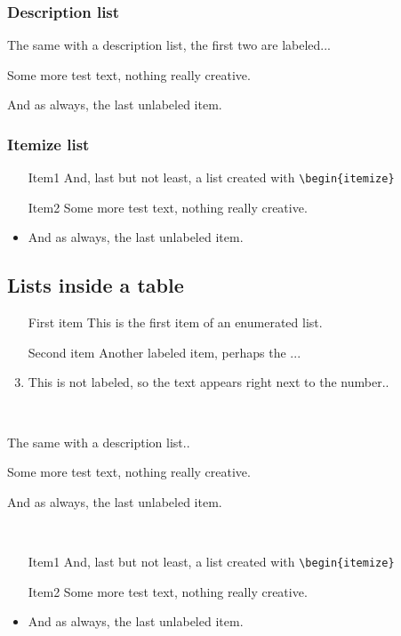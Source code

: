 \documentclass{generic}
\begin{document}
\subsubsection{Description list}
\begin{description}
\item[Item1]
  The same with a description list, 
  the first two are labeled...
\item[Item2]
  Some more test text, nothing really creative.
\item
  And as always, the last unlabeled item.
\end{description}

\subsubsection{Itemize list}
\begin{itemize}
\item[Item1]
  And, last but not least, a list created with \verb/\begin{itemize}/
\item[Item2]
  Some more test text, nothing really creative.
\item
  And as always, the last unlabeled item.
\end{itemize}
\endverbatim

\subsection{Lists inside a table}

\verbatim

\begin{table}
\begin{enumerate}
\item[First item]
  This is the first item of an enumerated list. 
\item[Second item]
  Another labeled item, perhaps the ...
\item
  This is not labeled, so the text appears right 
  next to the number..
\end{enumerate} 
\\

\begin{description}
\item[Item1]
  The same with a description list..
\item[Item2]
  Some more test text, nothing really creative.
\item
  And as always, the last unlabeled item.
\end{description}
\\

\begin{itemize}
\item[Item1]
  And, last but not least, a list created with \verb/\begin{itemize}/
\item[Item2]
  Some more test text, nothing really creative.
\item
  And as always, the last unlabeled item.
\end{itemize}

\end{table}
\endverbatim
\end{document}
